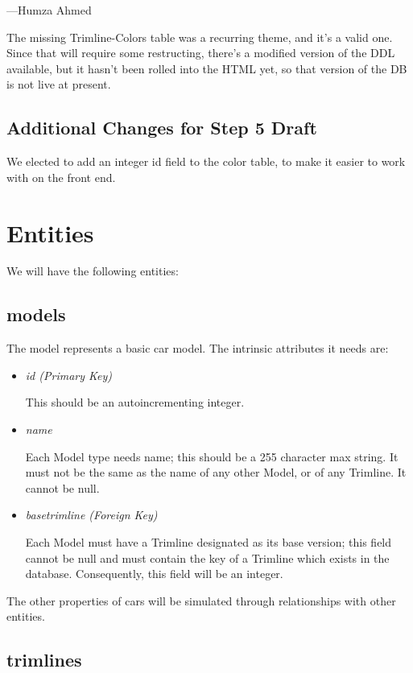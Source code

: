 \documentclass[11pt,letterpaper,oneside]{amsart}
\begin{document}
---Humza Ahmed

The missing Trimline-Colors table was a recurring theme, and it's a valid one.  Since that will require some restructing, there's a modified version of the DDL available, but it hasn't been rolled into the HTML yet, so that version of the DB is not live at present.

\subsection{Additional Changes for Step 5 Draft}

We elected to add an integer id field to the color table, to make it easier to work with on the front end.

\section*{Entities}

We will have the following entities:

\subsection*{models}
The model represents a basic car model.  The intrinsic attributes it needs are:
\begin{itemize}
	\item \emph{id (Primary Key)}
	
	This should be an autoincrementing integer.
	
	\item \emph{name}
	
	Each Model type needs name; this should be a 255 character max string.  It must not be the same as the name of any other Model, or of any Trimline.  It cannot be null.
	
	\item \emph{base{\textunderscore}trimline (Foreign Key)}
	
	Each Model must have a Trimline designated as its base version; this field cannot be null and must contain the key of a Trimline which exists in the database.  Consequently, this field will be an integer.
	
	
\end{itemize}

The other properties of cars will be simulated through relationships with other entities.

\subsection*{trimlines}
\end{document}
